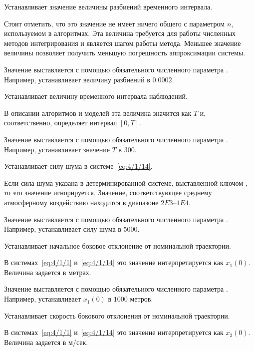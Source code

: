     \item[\code{-d~num}]
        Устанавливает значение величины разбиений временного интервала.

        Стоит отметить, что это значение не имеет ничего общего с параметром $n$, используемом в алгоритмах. Эта величина требуется для работы численных методов интегрирования и является шагом работы метода. Меньшее значение величины позволяет получить меньшую погрешность аппроксимации системы.

        Значение выставляется с помощью обязательного численного параметра . Например,  устанавливает величину разбиений в $0.0002$.

    \item[\code{-t~num}]
        Устанавливает величину временного интервала наблюдений.

        В описании алгоритмов и моделей эта величина значится как $T$ и, соответственно, определяет интервал $[0,T]$.

        Значение выставляется с помощью обязательного численного параметра . Например,  устанавливает значение $T$ в $300$.

    \item[\code{-v~num}]
        Устанавливает силу шума в системе~\ref{eq:4/1/14}.

        Если сила шума указана в детерминированной системе, выставленной ключом , то это значение игнорируется. Значение, соответствующее среднему атмосферному воздействию находится в диапазоне $2E3$--$1E4$.

        Значение выставляется с помощью обязательного численного параметра . Например,  устанавливает силу шума в $5000$.

    \item[\code{-x1~num}]
        Устанавливает начальное боковое отклонение от номинальной траектории.

        В системах~\ref{eq:4/1/1} и~\ref{eq:4/1/14} это значение интерпретируется как $x_1(0)$. Величина задается в метрах.

        Значение выставляется с помощью обязательного численного параметра . Например,  устанавливает $x_1(0)$ в $1000$ метров.

    \item[\code{-x2~num}]
        Устанавливает скорость бокового отклонения от номинальной траектории.

        В системах~\ref{eq:4/1/1} и~\ref{eq:4/1/14} это значение интерпретируется как $x_2(0)$. Величина задается в м/сек.


